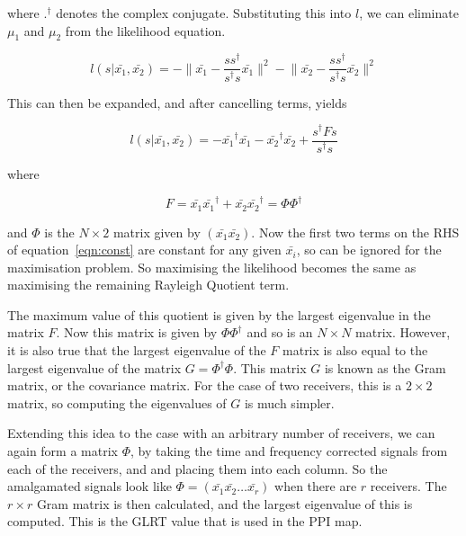 \documentclass[12pt,openany,a4paper]{book}
\begin{document}
\bigskip

where $.^\dagger$ denotes the complex conjugate. Substituting this into $l$, we can eliminate $\mu_1$ and $\mu_2$ from the likelihood equation.

\begin{equation}
l(s | \bar{x_1}, \bar{x_2}) = - \bigg\| \bar{x_1}-\frac{ss^\dagger }{s^\dagger s} \bar{x_1} \bigg\|^2
- \bigg\| \bar{x_2}-\frac{ss^\dagger }{s^\dagger s} \bar{x_2} \bigg\|^2
\end{equation}

\bigskip

This can then be expanded, and after cancelling terms, yields

\begin{equation}
\label{eqn:const}
l(s | \bar{x_1}, \bar{x_2}) = - \bar{x_1}^\dagger \bar{x_1} - \bar{x_2}^\dagger \bar{x_2}
+ \frac{s^\dagger F s}{s^\dagger s}
\end{equation}

\bigskip

where

\begin{equation}
F = \bar{x_1}\bar{x_1}^\dagger + \bar{x_2}\bar{x_2}^\dagger = \Phi \Phi^\dagger
\end{equation}

\bigskip

and $\Phi$ is the $N\times2$ matrix given by $(\bar{x_1} \bar{x_2})$. Now the first two terms on the RHS of equation~\ref{eqn:const} are constant for any given $\bar{x_i}$, so can be ignored for the maximisation problem. So maximising the likelihood becomes the same as maximising the remaining Rayleigh Quotient term.

\medskip

The maximum value of this quotient is given by the largest eigenvalue in the matrix $F$. Now this matrix is given by $\Phi \Phi^\dagger$ and so is an $N\times N$ matrix. However, it is also true that the largest eigenvalue of the $F$ matrix is also equal to the largest eigenvalue of the matrix $G = \Phi^{\dagger} \Phi$. This matrix $G$ is known as the Gram matrix, or the covariance matrix. For the case of two receivers, this is a $2\times2$ matrix, so computing the eigenvalues of $G$ is much simpler.

\bigskip

Extending this idea to the case with an arbitrary number of receivers, we can again form a matrix $\Phi$, by taking the time and frequency corrected signals from each of the receivers, and and placing them into each column. So the amalgamated signals look like $\Phi = (\bar{x_1} \bar{x_2} \ldots \bar{x_r} )$ when there are $r$ receivers. The $r\times r$ Gram matrix is then calculated, and the largest eigenvalue of this is computed. This is the GLRT value that is used in the PPI map.
\end{document}
